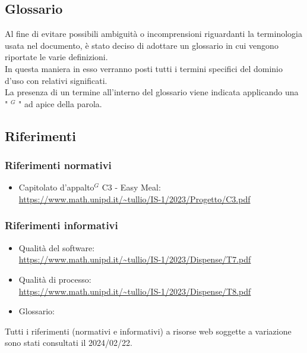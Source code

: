 \subsection{Glossario}
Al fine di evitare possibili ambiguità o incomprensioni riguardanti la terminologia usata nel documento, è stato deciso di adottare un glossario in cui vengono riportate le varie definizioni. \\
In questa maniera in esso verranno posti tutti i termini specifici del dominio d’uso con relativi significati. \\
La presenza di un termine all’interno del glossario viene indicata applicando una " $^{G}$ " ad apice della parola.
\subsection{Riferimenti}
\subsubsection{Riferimenti normativi}
    \begin{itemize}
        \item Capitolato d’appalto$^{G}$ C3 - Easy Meal: \\
        \url{https://www.math.unipd.it/~tullio/IS-1/2023/Progetto/C3.pdf}
    \end{itemize}
\subsubsection{Riferimenti informativi}
\begin{itemize}
    \item Qualità del software: \\
    \url{https://www.math.unipd.it/~tullio/IS-1/2023/Dispense/T7.pdf}
    \item Qualità di processo:\\
    \url{https://www.math.unipd.it/~tullio/IS-1/2023/Dispense/T8.pdf}
    \item Glossario: \\
    \url{} %
\end{itemize}

Tutti i riferimenti (normativi e informativi) a risorse web soggette a variazione sono stati consultati il 2024/02/22.

